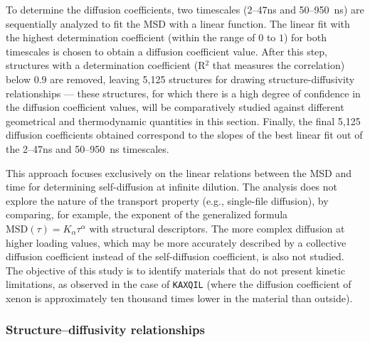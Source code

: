 \documentclass[main]{subfiles}
\begin{document}
To determine the diffusion coefficients, two timescales (2--47\si{\ns} and 50--950~\si{\ns}) are sequentially analyzed to fit the MSD with a linear function. The linear fit with the highest determination coefficient (within the range of $0$ to $1$) for both timescales is chosen to obtain a diffusion coefficient value. After this step, structures with a determination coefficient (R$^2$ that measures the correlation) below $0.9$ are removed, leaving 5,125 structures for drawing structure-diffusivity relationships --- these structures, for which there is a high degree of confidence in the diffusion coefficient values, will be comparatively studied against different geometrical and thermodynamic quantities in this section. Finally, the final 5,125 diffusion coefficients obtained correspond to the slopes of the best linear fit out of the 2--47\si{\ns} and 50--950~\si{\ns} timescales.

This approach focuses exclusively on the linear relations between the MSD and time for determining self-diffusion at infinite dilution. The analysis does not explore the nature of the transport property (e.g., single-file diffusion\autocite{Lin_2005}), by comparing, for example, the exponent of the generalized formula $\text{MSD}(\tau) = K_\alpha\tau^\alpha$ with structural descriptors. The more complex diffusion at higher loading values, which may be more accurately described by a collective diffusion coefficient instead of the self-diffusion coefficient, is also not studied. The objective of this study is to identify materials that do not present kinetic limitations, as observed in the case of \texttt{KAXQIL}\autocite{Banerjee2012} (where the diffusion coefficient of xenon is approximately ten thousand times lower in the material than outside).

\subsubsection{Structure--diffusivity relationships}\label{sct:xenon_diff_screen}
\end{document}
